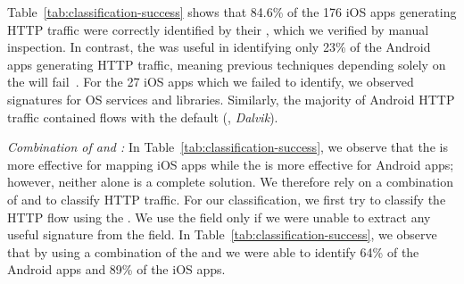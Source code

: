 Table~\ref{tab:classification-success} shows that 84.6\% of the 176 iOS apps generating HTTP traffic were correctly identified by their \useragent, which we verified by manual inspection.
In contrast, the \useragent was useful in identifying only 23\% of the Android apps generating HTTP traffic, meaning previous techniques depending solely on the \useragent will fail~\cite{maier:mobtraffic,xu:appusage}. 
For the 27 iOS apps which we failed to identify, we observed signatures for OS services and libraries.
Similarly, the majority of Android HTTP traffic contained flows with the default \useragent (\eg, \emph{Dalvik}).

\emph{Combination of \useragent and \httphost:} 
In Table~\ref{tab:classification-success}, we observe that the \useragent is more effective for mapping iOS apps while the \httphost is more effective for Android apps; however, neither alone is a complete solution. 
We therefore rely on a combination of \useragent and \httphost to classify HTTP traffic. 
For our classification, we first try to classify the HTTP flow using the \useragent.
We use the \httphost field only if we were unable to extract any useful signature from the \useragent field. 
In Table~\ref{tab:classification-success}, we observe that by using a combination of the \useragent and \httphost we were able to identify 64\% of the Android apps and 89\% of the iOS apps. 

